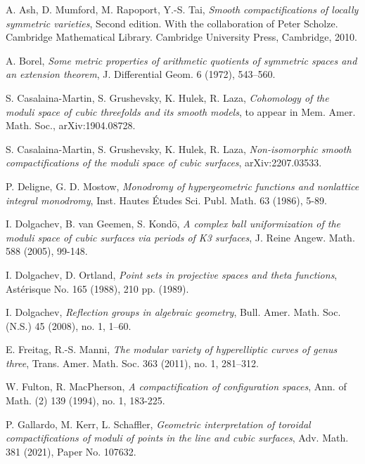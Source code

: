 \documentclass[12pt, pdftex]{amsart}
\theoremstyle{plain}
\theoremstyle{definition}
\numberwithin{equation}{section}
\begin{document}
\begin{thebibliography}{99}

A. Ash,  D. Mumford, M. Rapoport, Y.-S. Tai, 
\textit{Smooth compactifications of locally symmetric varieties}, 
Second edition. With the collaboration of Peter Scholze. Cambridge Mathematical Library. Cambridge University Press, Cambridge, 2010.

A. Borel,
\textit{Some metric properties of arithmetic quotients of symmetric spaces and an extension theorem},
 J. Differential Geom. 6 (1972), 543--560.

S. Casalaina-Martin, S. Grushevsky, K. Hulek, R. Laza,
\textit{Cohomology of the moduli space of cubic threefolds and its smooth models},
to appear in Mem. Amer. Math. Soc., arXiv:1904.08728. 

S. Casalaina-Martin, S. Grushevsky, K. Hulek, R. Laza,
\textit{Non-isomorphic smooth compactifications of the moduli space of cubic surfaces}, 
arXiv:2207.03533.

P. Deligne, G. D. Mostow,
\textit{Monodromy of hypergeometric functions and nonlattice integral monodromy},
Inst. Hautes Études Sci. Publ. Math. 63 (1986), 5-89.

I. Dolgachev, B. van Geemen, S. Kond\={o},
\textit{A complex ball uniformization of the moduli space of cubic surfaces via periods of K3 surfaces},
J. Reine Angew. Math. 588 (2005), 99-148.


I. Dolgachev, D. Ortland,
\textit{Point sets in projective spaces and theta functions},
Astérisque No. 165 (1988), 210 pp. (1989).

I. Dolgachev,
\textit{Reflection groups in algebraic geometry},
Bull. Amer. Math. Soc. (N.S.) 45 (2008), no. 1, 1–60.

E. Freitag, R.-S. Manni,
\textit{The modular variety of hyperelliptic curves of genus three},
Trans. Amer. Math. Soc. 363 (2011), no. 1, 281–312.


W. Fulton, R. MacPherson,
\textit{A compactification of configuration spaces},
Ann. of Math. (2) 139 (1994), no. 1, 183-225.


P. Gallardo, M. Kerr, L. Schaffler,
\textit{Geometric interpretation of toroidal compactifications of moduli of points in the line and cubic surfaces},
Adv. Math. 381 (2021), Paper No. 107632.


\end{thebibliography}
\end{document}
